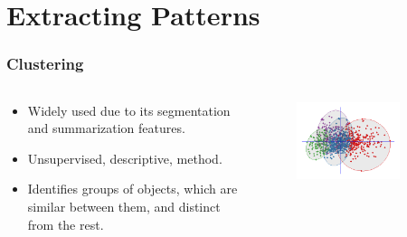 \documentclass[hyperref={pdfpagelabels=true}]{beamer}
\begin{document}
\section{Extracting Patterns} 
\begin{frame}
\frametitle{Clustering}
\begin{columns}
  \begin{column}{0.5\textwidth}\small{ 
    \begin{itemize}
      \item<1->Widely used due to its segmentation and summarization features.
      \item<2->Unsupervised, descriptive, method.
      \item<3->Identifies groups of objects, which are similar between them, and distinct from the rest.
      \end{itemize}  }
  \end{column}
  \begin{column}{0.5\textwidth}
      \begin{figure}  
	\includegraphics[width=0.8\textwidth]{Cluster_analysis.png}
       \end{figure}  
  \end{column}  
\end{columns}
\end{frame}
\end{document}
